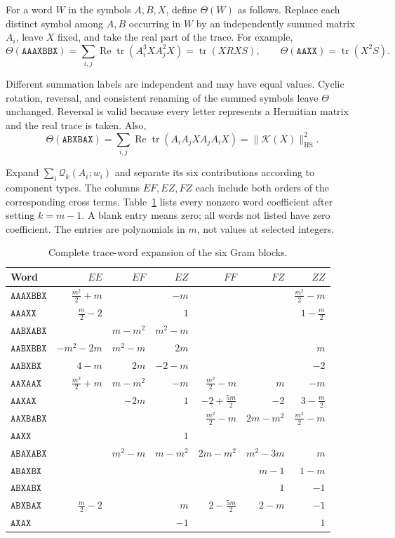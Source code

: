 \documentclass[11pt]{article}
\newcommand{\tr}{\operatorname{tr}}
\newcommand{\Rea}{\operatorname{Re}}
\newcommand{\HS}{\mathrm{HS}}
\newcommand{\cK}{\mathcal K}
\newcommand{\gQ}{\mathscr Q}
\newcommand{\nrm}[1]{\lVert #1\rVert}
\newcommand{\word}[1]{\mathtt{#1}}
\begin{document}
For a word \(W\) in the symbols \(A,B,X\), define \(\Theta(W)\) as
follows. Replace each distinct symbol among \(A,B\) occurring in \(W\)
by an independently summed matrix \(A_i\), leave \(X\) fixed, and take
the real part of the trace. For example,
\[
 \Theta(\word{AAAXBBX})
   =\sum_{i,j}\Rea\tr(A_i^3XA_j^2X)=\tr(XRXS),
 \qquad
 \Theta(\word{AAXX})=\tr(X^2S).
\]

Different summation labels are independent and may have equal values.
Cyclic rotation, reversal, and consistent renaming of the summed
symbols leave \(\Theta\) unchanged. Reversal is valid because every
letter represents a Hermitian matrix and the real trace is taken.
Also,
\[
 \Theta(\word{ABXBAX})
 =\sum_{i,j}\Rea\tr(A_iA_jXA_jA_iX)
 =\nrm{\cK(X)}_{\HS}^2.
\]

Expand \(\sum_i\gQ_k(A_i;w_i)\) and separate its six contributions
according to component types. The columns \(EF,EZ,FZ\) each include
both orders of the corresponding cross terms. Table~\ref{tab:expansion}
lists every nonzero word coefficient after setting \(k=m-1\).
A blank entry means zero; all words not listed have zero coefficient.
The entries are polynomials in \(m\), not values at selected integers.

\begin{table}[!htbp]
\centering
\caption{Complete trace-word expansion of the six Gram blocks.}
\label{tab:expansion}
\begingroup
\setlength{\tabcolsep}{3.5pt}
\renewcommand{\arraystretch}{1.65}
\small
\begin{tabular}{lrrrrrr}
\toprule
Word & \(EE\) & \(EF\) & \(EZ\) & \(FF\) & \(FZ\) & \(ZZ\)\\
\midrule
\(\word{AAAXBBX}\)&
 \(\frac{m^2}2+m\)&&\(-m\)&&&\(\frac{m^2}2-m\)\\
\(\word{AAAXX}\)&
 \(\frac m2-2\)&&\(1\)&&&\(1-\frac m2\)\\
\(\word{AABXABX}\)&&
 \(m-m^2\)&\(m^2-m\)&&&\\
\(\word{AABXBBX}\)&
 \(-m^2-2m\)&\(m^2-m\)&\(2m\)&&&\(m\)\\
\(\word{AABXBX}\)&
 \(4-m\)&\(2m\)&\(-2-m\)&&&\(-2\)\\
\(\word{AAXAAX}\)&
 \(\frac{m^2}2+m\)&\(m-m^2\)&\(-m\)&
 \(\frac{m^2}2-m\)&\(m\)&\(-m\)\\
\(\word{AAXAX}\)&&
 \(-2m\)&\(1\)&\(-2+\frac{5m}2\)&\(-2\)&\(3-\frac m2\)\\
\(\word{AAXBABX}\)&&&&
 \(\frac{m^2}2-m\)&\(2m-m^2\)&\(\frac{m^2}2-m\)\\
\(\word{AAXX}\)&&&\(1\)&&&\\
\(\word{ABAXABX}\)&&
 \(m^2-m\)&\(m-m^2\)&\(2m-m^2\)&\(m^2-3m\)&\(m\)\\
\(\word{ABAXBX}\)&&&&&\(m-1\)&\(1-m\)\\
\(\word{ABXABX}\)&&&&&\(1\)&\(-1\)\\
\(\word{ABXBAX}\)&
 \(\frac m2-2\)&&\(m\)&\(2-\frac{5m}2\)&\(2-m\)&\(-1\)\\
\(\word{AXAX}\)&&&\(-1\)&&&\(1\)\\
\bottomrule
\end{tabular}
\endgroup
\end{table}
\end{document}
